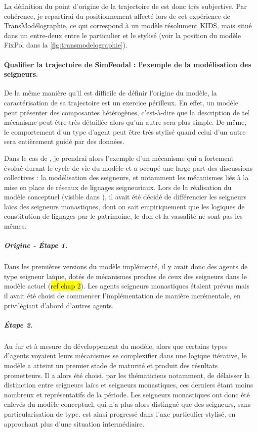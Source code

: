 La définition du point d'origine de la trajectoire de \simfeodal{} est donc très subjective.
Par cohérence, je repartirai du positionnement affecté lors de cet expérience de \og TransModélographie\fg{}, ce qui correspond à un modèle résolument KIDS, mais situé dans un entre-deux entre le particulier et le stylisé (voir la position du modèle FixPol dans la \cref{fig:transmodelographie}). 

\paragraph{Qualifier la trajectoire de SimFeodal : l'exemple de la modélisation des seigneurs.}

De la même manière qu'il est difficile de définir l'origine du modèle, la caractérisation de sa trajectoire est un exercice périlleux.
En effet, un modèle peut présenter des composantes hétérogènes, c'est-à-dire que la description de tel mécanisme peut être très détaillée alors qu'un autre sera plus simple.
De même, le comportement d'un type d'agent peut être très stylisé quand celui d'un autre sera entièrement guidé par des données.

Dans le cas de \simfeodal{}, je prendrai alors l'exemple d'un mécanisme qui a fortement évolué durant le cycle de vie du modèle et a occupé une large part des discussions collectives : la modélisation des seigneurs, et notamment les mécanismes liés à la mise en place de réseaux de lignages seigneuriaux.
Lors de la réalisation du modèle conceptuel (visible dans \textcite[fig. 13.1, p. 297]{tannier_ontologie_2014}), il avait été décidé de différencier les seigneurs laïcs des seigneurs monastiques, dont on sait empiriquement que les logiques de constitution de lignages par le patrimoine, le don et la vassalité ne sont pas les mêmes.

\subparagraph{Origine - Étape 1.}Dans les premières versions du modèle implémenté, il y avait donc des agents de type \og seigneur laïque\fg{}, dotés de mécanismes proches de ceux des \og seigneurs\fg{} dans le modèle actuel (\hl{ref chap 2}).
Les agents \og seigneurs monastiques\fg{} étaient prévus mais il avait été choisi de commencer l'implémentation de manière incrémentale, en privilégiant d'abord d'autres agents.

\subparagraph{Étape 2.}Au fur et à mesure du développement du modèle, alors que certains types d'agents voyaient leurs mécanismes se complexifier dans une logique itérative, le modèle a atteint un premier stade de maturité et produit des résultats prometteurs.
Il a alors été choisi, par les thématiciens notamment, de délaisser la distinction entre seigneurs laïcs et seigneurs monastiques, ces derniers étant moins nombreux et représentatifs de la période.
Les seigneurs monastiques ont donc été enlevés du modèle conceptuel, qui n'a plus alors distingué que des \og seigneurs\fg{}, sans particularisation de type.
\simfeodal{} est ainsi progressé dans l'axe particulier-stylisé, en approchant plus d'une situation intermédiaire.

